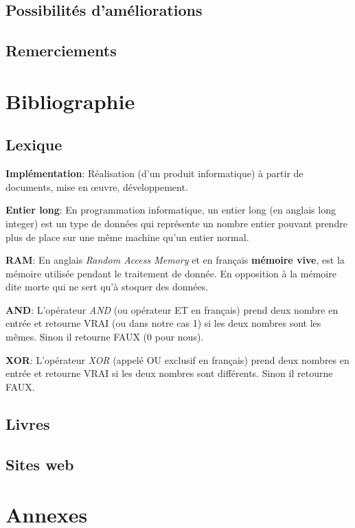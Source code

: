 \documentclass[a4paper]{article}
\newcommand{\lexique}[2]{\item{\textbf{#1}:} #2}
\begin{document}
\subsection{Possibilités d'améliorations}
\subsection{Remerciements}

\newpage
\section{Bibliographie}
\subsection{Lexique}
    \begin{description}
        \lexique{Implémentation}{Réalisation (d’un produit informatique) à partir de documents, mise en œuvre, développement.}
        \lexique{Entier long}{En programmation informatique, un entier long (en anglais long integer) est un type de données qui représente un nombre entier pouvant prendre plus de place sur une même machine qu'un entier normal.}
        \lexique{RAM}{En anglais \textit{Random Access Memory} et en français \textbf{mémoire vive}, est la mémoire utilisée pendant le traitement de donnée. En opposition à la mémoire dite morte qui ne sert qu'à stoquer des données.}
        \lexique{AND}{L'opérateur \textit{AND} (ou opérateur ET en français) prend deux nombre en entrée et retourne VRAI (ou dans notre cas 1) si les deux nombres sont les mêmes. Sinon il retourne FAUX (0 pour nous).}
        \lexique{XOR}{L'opérateur \textit{XOR} (appelé OU exclusif en français) prend deux nombres en entrée et retourne VRAI si les deux nombres sont différents. Sinon il retourne FAUX.}
    \end{description}
\subsection{Livres}
\printbibliography[heading=none, type=book]
\subsection{Sites web}
\printbibliography[heading=none, type=misc]

\section{Annexes}
\end{document}
